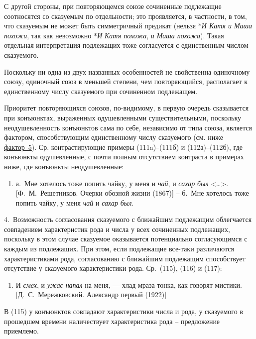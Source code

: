 С другой стороны, при повторяющемся союзе сочиненные подлежащие
соотносятся со сказуемым по отдельности; это проявляется, в частности, в
том, что сказуемым не может быть симметричный предикат (нельзя *\emph{И
Катя и Маша похожи}, так как невозможно *\emph{И Катя похожа}, \emph{и
Маша похожа}). Такая отдельная интерпретация подлежащих тоже согласуется
с единственным числом сказуемого.

Поскольку ни одна из двух названных особенностей не свойственна
одиночному союзу, одиночный союз в меньшей степени, чем повторяющийся,
располагает к единственному числу сказуемого при сочиненном подлежащем.

Приоритет повторяющихся союзов, по-видимому, в первую очередь
сказывается при конъюнктах, выраженных одушевленными существительными,
поскольку неодушевленность конъюнктов сама по себе, независимо от типа
союза, является фактором, способствующим единственному числу сказуемого
(см. ниже \underline{фактор~5}). Ср. контрастирующие примеры
(111a)--(111б) и (112а)--(112б), где конъюнкты одушевленные, с почти
полным отсутствием контраста в примерах ниже, где конъюнкты
неодушевленные:

\begin{enumerate}
\def\labelenumi{(\arabic{enumi})}
\setcounter{enumi}{113}
\item
  а.~Мне хотелось тоже попить чайку, у меня и \emph{чай}, и \emph{сахар}
  \emph{был} \textless\ldots\textgreater. {[}Ф.~М.~Решетников. Очерки
  обозной жизни (1867){]} -- б.~Мне хотелось тоже попить чайку, у меня
  \emph{чай} и \emph{сахар} \emph{был}.
\end{enumerate}

4.~Возможность согласования сказуемого с ближайшим подлежащим
облегчается совпадением характеристик рода и числа у всех сочиненных
подлежащих, поскольку в этом случае сказуемое оказывается потенциально
согласующимся с каждым из подлежащих. При этом, если подлежащие все-таки
различаются характеристиками рода, согласованию с ближайшим подлежащим
способствует отсутствие у сказуемого характеристики рода. Ср.~(115),
(116) и (117):

\begin{enumerate}
\def\labelenumi{(\arabic{enumi})}
\setcounter{enumi}{114}
\item
  И \emph{смех}, и \emph{ужас напал} на меня, ― хлад мраза тонка, как
  говорят мистики. {[}Д.~С.~Мережковский. Александр первый (1922){]}
\end{enumerate}

В (115) у конъюнктов совпадают характеристики числа и рода, у сказуемого
в прошедшем времени наличествует характеристика рода -- предложение
приемлемо.


